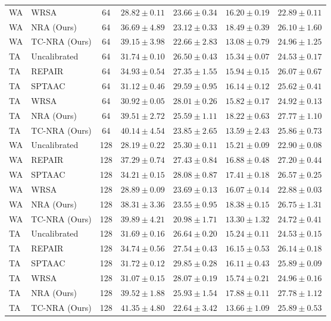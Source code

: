 \documentclass{article}
\theoremstyle{plain}
\theoremstyle{definition}
\theoremstyle{remark}
\begin{document}
\begin{table}[t]
\begin{center}
\begin{small}
\begin{tabular}{llccccc}
WA & WRSA & 64 & $28.82 \pm 0.11$ & $23.66 \pm 0.34$ & $16.20 \pm 0.19$ & $22.89 \pm 0.11$ \\
WA & NRA (Ours) & 64 & $36.69 \pm 4.89$ & $23.12 \pm 0.33$ & $\mathbf{18.49 \pm 0.39}$ & $26.10 \pm 1.60$ \\
WA & TC-NRA (Ours) & 64 & $39.15 \pm 3.98$ & $22.66 \pm 2.83$ & $13.08 \pm 0.79$ & $24.96 \pm 1.25$ \\
\midrule
TA & Uncalibrated & 64 & $31.74 \pm 0.10$ & $26.50 \pm 0.43$ & $15.34 \pm 0.07$ & $24.53 \pm 0.17$ \\
TA & REPAIR & 64 & $34.93 \pm 0.54$ & $27.35 \pm 1.55$ & $15.94 \pm 0.15$ & $26.07 \pm 0.67$ \\
TA & SPTAAC & 64 & $31.12 \pm 0.46$ & $\mathbf{29.59 \pm 0.95}$ & $16.14 \pm 0.12$ & $25.62 \pm 0.41$ \\
TA & WRSA & 64 & $30.92 \pm 0.05$ & $28.01 \pm 0.26$ & $15.82 \pm 0.17$ & $24.92 \pm 0.13$ \\
TA & NRA (Ours) & 64 & $39.51 \pm 2.72$ & $25.59 \pm 1.11$ & $\mathbf{18.22 \pm 0.63}$ & $\mathbf{27.77 \pm 1.10}$ \\
TA & TC-NRA (Ours) & 64 & $\mathbf{40.14 \pm 4.54}$ & $23.85 \pm 2.65$ & $13.59 \pm 2.43$ & $25.86 \pm 0.73$ \\
\midrule
WA & Uncalibrated & 128 & $28.19 \pm 0.22$ & $25.30 \pm 0.11$ & $15.21 \pm 0.09$ & $22.90 \pm 0.08$ \\
WA & REPAIR & 128 & $37.29 \pm 0.74$ & $27.43 \pm 0.84$ & $16.88 \pm 0.48$ & $\mathbf{27.20 \pm 0.44}$ \\
WA & SPTAAC & 128 & $34.21 \pm 0.15$ & $28.08 \pm 0.87$ & $17.41 \pm 0.18$ & $26.57 \pm 0.25$ \\
WA & WRSA & 128 & $28.89 \pm 0.09$ & $23.69 \pm 0.13$ & $16.07 \pm 0.14$ & $22.88 \pm 0.03$ \\
WA & NRA (Ours) & 128 & $38.31 \pm 3.36$ & $23.55 \pm 0.95$ & $\mathbf{18.38 \pm 0.15}$ & $26.75 \pm 1.31$ \\
WA & TC-NRA (Ours) & 128 & $\mathbf{39.89 \pm 4.21}$ & $20.98 \pm 1.71$ & $13.30 \pm 1.32$ & $24.72 \pm 0.41$ \\
\midrule
TA & Uncalibrated & 128 & $31.69 \pm 0.16$ & $26.64 \pm 0.20$ & $15.24 \pm 0.11$ & $24.53 \pm 0.15$ \\
TA & REPAIR & 128 & $34.74 \pm 0.56$ & $27.54 \pm 0.43$ & $16.15 \pm 0.53$ & $26.14 \pm 0.18$ \\
TA & SPTAAC & 128 & $31.72 \pm 0.12$ & $\mathbf{29.85 \pm 0.28}$ & $16.11 \pm 0.43$ & $25.89 \pm 0.09$ \\
TA & WRSA & 128 & $31.07 \pm 0.15$ & $28.07 \pm 0.19$ & $15.74 \pm 0.21$ & $24.96 \pm 0.16$ \\
TA & NRA (Ours) & 128 & $39.52 \pm 1.88$ & $25.93 \pm 1.54$ & $\mathbf{17.88 \pm 0.11}$ & $\mathbf{27.78 \pm 1.12}$ \\
TA & TC-NRA (Ours) & 128 & $\mathbf{41.35 \pm 4.80}$ & $22.64 \pm 3.42$ & $13.66 \pm 1.09$ & $25.89 \pm 0.53$ \\
\bottomrule
\end{tabular}
\end{small}
\end{center}
\end{table}
\end{document}
